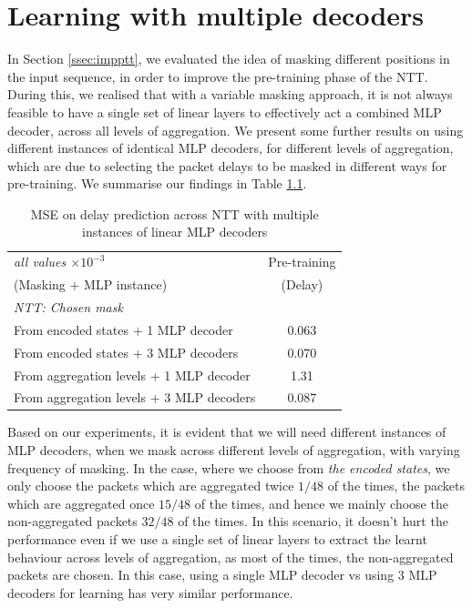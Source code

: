 \chapter{Learning with multiple decoders}
\label{app:b}

In Section \ref{ssec:impptt}, we evaluated the idea of masking different positions in the input sequence, in order to improve the pre-training phase of the NTT.  During this, we realised that with a variable masking approach, it is not always feasible to have a single set of linear layers to effectively act a combined MLP decoder, across all levels of aggregation. We present some further results on using different instances of identical MLP decoders, for different levels of aggregation, which are due to selecting the packet delays to be masked in different ways for pre-training. We summarise our findings in Table \ref{app:table2}.

\begin{table}[htbp]
\centering
\begin{tabular}{ l   c  }
\toprule
\emph{all values $\times10^{-3}$} & Pre-training \\
(Masking + MLP instance) & (Delay)  \\
                                                       
\midrule
\em{NTT: Chosen mask}                                              & 		 	 \\
\smallindent From encoded states + 1 MLP decoder                                         &      0.063         \\
\smallindent From encoded states + 3 MLP decoders                                         &     0.070          \\
\smallindent From aggregation levels + 1 MLP decoder  					&     1.31          \\
\smallindent  From aggregation levels + 3 MLP decoders  					&     0.087          \\
 
    
\bottomrule

\end{tabular}
\caption{MSE on delay prediction across NTT with multiple instances of linear MLP decoders}
\label{app:table2}
\end{table}

Based on our experiments, it is evident that we will need different instances of MLP decoders, when we mask across different levels of aggregation, with varying frequency of masking. In the case, where we choose from \emph{the encoded states}, we only choose the packets which are aggregated twice $1/48$ of the times, the packets which are aggregated once $15/48$ of the times, and hence we mainly choose the non-aggregated packets \ie $32/48$ of the times. In this scenario, it doesn't hurt the performance even if we use a single set of linear layers to extract the learnt behaviour across levels of aggregation, as most of the times, the non-aggregated packets are chosen. In this case, using a single MLP decoder vs using $3$ MLP decoders for learning has very similar performance.

